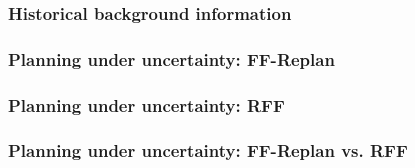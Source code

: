 \documentclass{beamer}
\let\origframetitle=\frametitle
\renewcommand\frametitle[1]{\origframetitle{\textbf{\large{\textrm{#1}}}}}
\begin{document}
\begin{frame}
  \frametitle{Historical background information}
\end{frame}

\begin{frame}
  \frametitle{Planning under uncertainty: FF-Replan}
\end{frame}

\begin{frame}
  \frametitle{Planning under uncertainty: RFF}
\end{frame}

\begin{frame}
  \frametitle{Planning under uncertainty: FF-Replan vs. RFF}
\end{frame}



\end{document}
